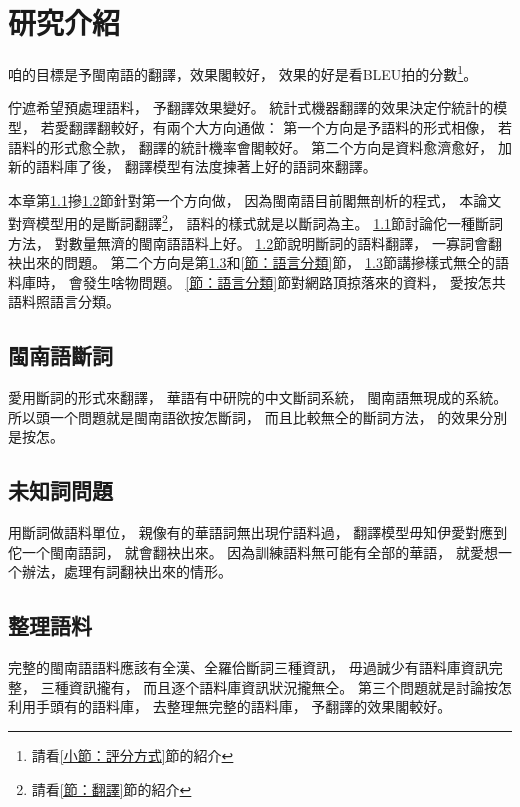\chapter{研究介紹}
\label{章：研究介紹}

咱的目標是予閩南語的翻譯，效果閣較好，
效果的好是看BLEU拍的分數\footnote{請看\ref{小節：評分方式}節的紹介}。

佇遮希望預處理語料，
予翻譯效果變好。
統計式機器翻譯的效果決定佇統計的模型，
若愛翻譯翻較好，有兩个大方向通做：
第一个方向是予語料的形式相像，
若語料的形式愈仝款，
翻譯的統計機率會閣較好。
第二个方向是資料愈濟愈好，
加新的語料庫了後，
翻譯模型有法度揀著上好的語詞來翻譯。

本章第\ref{節：閩南語斷詞}摻\ref{節：未知詞問題}節針對第一个方向做，
因為閩南語目前閣無剖析的程式，
本論文對齊模型用的是斷詞翻譯\footnote{請看\ref{節：翻譯}節的紹介}，
語料的樣式就是以斷詞為主。
\ref{節：閩南語斷詞}節討論佗一種斷詞方法，
對數量無濟的閩南語語料上好。
\ref{節：未知詞問題}節說明斷詞的語料翻譯，
一寡詞會翻袂出來的問題。
第二个方向是第\ref{節：整理語料}和\ref{節：語言分類}節，
\ref{節：整理語料}節講摻樣式無仝的語料庫時，
會發生啥物問題。
\ref{節：語言分類}節對網路頂掠落來的資料，
愛按怎共語料照語言分類。

\section{閩南語斷詞}
\label{節：閩南語斷詞}
愛用斷詞的形式來翻譯，
華語有中研院的中文斷詞系統，
閩南語無現成的系統。
所以頭一个問題就是閩南語欲按怎斷詞，
而且比較無仝的斷詞方法，
的效果分別是按怎。

\section{未知詞問題}
\label{節：未知詞問題}
用斷詞做語料單位，
親像有的華語詞無出現佇語料過，
翻譯模型毋知伊愛對應到佗一个閩南語詞，
就會翻袂出來。
因為訓練語料無可能有全部的華語，
就愛想一个辦法，處理有詞翻袂出來的情形。




\section{整理語料}
\label{節：整理語料}
完整的閩南語語料應該有全漢、全羅佮斷詞三種資訊，
毋過誠少有語料庫資訊完整，
三種資訊攏有，
而且逐个語料庫資訊狀況攏無仝。
第三个問題就是討論按怎利用手頭有的語料庫，
去整理無完整的語料庫，
予翻譯的效果閣較好。

